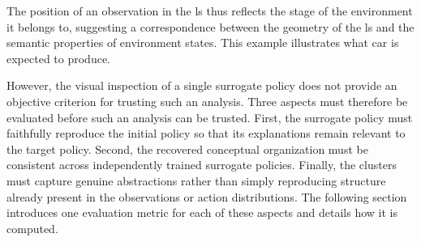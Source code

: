 

The position of an observation in the \gls{ls} thus reflects the stage of the environment it belongs to, suggesting a correspondence between the geometry of the \gls{ls} and the semantic properties of environment states.
This example illustrates what \gls{car} is expected to produce.

However, the visual inspection of a single surrogate policy does not provide an objective criterion for trusting such an analysis.
Three aspects must therefore be evaluated before such an analysis can be trusted.
First, the surrogate policy must faithfully reproduce the initial policy so that its explanations remain relevant to the target policy.
Second, the recovered conceptual organization must be consistent across independently trained surrogate policies.
Finally, the clusters must capture genuine abstractions rather than simply reproducing structure already present in the observations or action distributions.
The following section introduces one evaluation metric for each of these aspects and details how it is computed.

